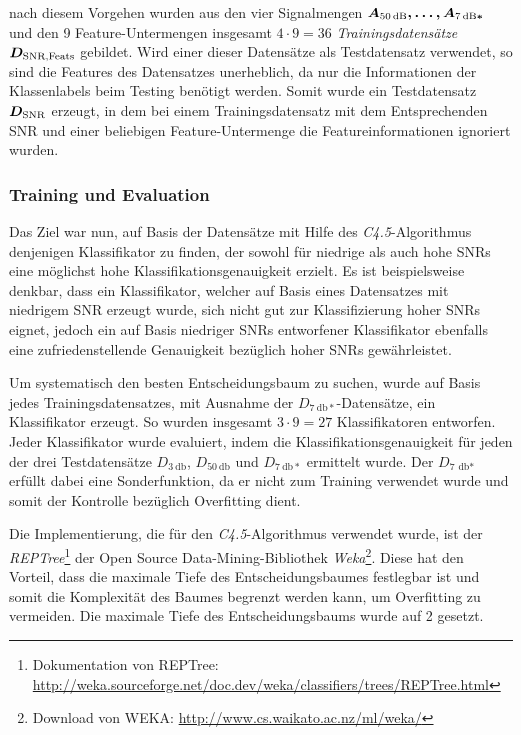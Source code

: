 nach diesem Vorgehen wurden aus den vier Signalmengen $\boldmath{A_{\SI{50}{\decibel}}}, \ldots , \boldmath{A_{\SI{7}{\decibel}*}}$ und den 9 Feature-Untermengen insgesamt $4 \cdot 9 = 36$ \emph{Trainingsdatensätze} $\boldmath{D_{\text{SNR,Feats}}}$ gebildet. Wird einer dieser Datensätze als Testdatensatz verwendet, so sind die Features des Datensatzes unerheblich, da nur die Informationen der Klassenlabels beim Testing benötigt werden. Somit wurde ein Testdatensatz $\boldmath{D_{\text{SNR}}}$ erzeugt, in dem bei einem Trainingsdatensatz mit dem Entsprechenden SNR und einer beliebigen Feature-Untermenge die Featureinformationen ignoriert wurden.

\subsubsection{Training und Evaluation}
\label{sec:vad_training}

Das Ziel war nun, auf Basis der Datensätze mit Hilfe des \emph{C4.5}-Algorithmus denjenigen Klassifikator zu finden, der sowohl für niedrige als auch hohe SNRs eine möglichst hohe Klassifikationsgenauigkeit erzielt. Es ist beispielsweise denkbar, dass ein Klassifikator, welcher auf Basis eines Datensatzes mit niedrigem SNR erzeugt wurde, sich nicht gut zur Klassifizierung hoher SNRs eignet, jedoch ein auf Basis niedriger SNRs entworfener Klassifikator ebenfalls eine zufriedenstellende Genauigkeit bezüglich hoher SNRs gewährleistet.

Um systematisch den besten Entscheidungsbaum zu suchen, wurde auf Basis jedes Trainingsdatensatzes, mit Ausnahme der $D_{\SI{7}{\decibel}*}$-Datensätze, ein Klassifikator erzeugt. So wurden insgesamt $3 \cdot 9 = 27$ Klassifikatoren entworfen. Jeder Klassifikator wurde evaluiert, indem die Klassifikationsgenauigkeit für jeden der drei Testdatensätze $D_{\SI{3}{\decibel}}$, $D_{\SI{50}{\decibel}}$ und $D_{\SI{7}{\decibel}*}$ ermittelt wurde. Der $D_{\SI{7}{\decibel*}}$ erfüllt dabei eine Sonderfunktion, da er nicht zum Training verwendet wurde und somit der Kontrolle bezüglich Overfitting dient.

Die Implementierung, die für den \emph{C4.5}-Algorithmus verwendet wurde, ist der \emph{REPTree}\footnote{Dokumentation von REPTree: \url{http://weka.sourceforge.net/doc.dev/weka/classifiers/trees/REPTree.html}} der Open Source Data-Mining-Bibliothek \emph{Weka}\footnote{Download von WEKA: \url{http://www.cs.waikato.ac.nz/ml/weka/}}. Diese hat den Vorteil, dass die maximale Tiefe des Entscheidungsbaumes festlegbar ist und somit die Komplexität des Baumes begrenzt werden kann, um Overfitting zu vermeiden. Die maximale Tiefe des Entscheidungsbaums wurde auf 2 gesetzt. 

